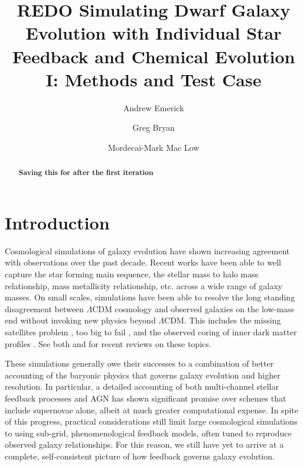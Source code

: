 \documentclass[twocolumn]{aastex61}
\begin{document}
\title{REDO Simulating Dwarf Galaxy Evolution with Individual Star Feedback and Chemical Evolution I: Methods and Test Case}
\author{Andrew Emerick}
\author{Greg Bryan}
\author{Mordecai-Mark Mac Low}


\begin{abstract}
\textbf{Saving this for after the first iteration}
\end{abstract}


\section{Introduction}

Cosmological simulations of galaxy evolution have shown increasing agreement with observations over the past decade. Recent works have been able to well capture the star forming main sequence, the stellar mass to halo mass relationship, mass metallicity relationship, etc. \citep[e.g.][]{EAGLE,Illustris1,Illustris2,FIRE,Dave2017} across a wide range of galaxy masses. On small scales, simulations have been able to resolve the long standing disagreement between $\Lambda$CDM cosmology and observed galaxies on the low-mass end without invoking new physics beyond $\Lambda$CDM. This includes the missing satellites problem \citep{Moore1999,Klypin1999}, too big to fail \citep{MBK2011,MBK2012,GK2014}, and the observed coring of inner dark matter profiles \citep[e.g.][]{Oh2011}. See both \cite{SomervilleDave2015} and \cite{NaabOstriker2016} for recent reviews on these topics. 

These simulations generally owe their successes to a combination of better accounting of the baryonic physics that governs galaxy evolution and higher resolution. In particular, a detailed accounting of both multi-channel stellar feedback processes and AGN has shown significant promise over schemes that include supernovae alone, albeit at much greater computational expense. In spite of this progress, practical considerations still limit large cosmological simulations to using sub-grid, phenomenological feedback models, often tuned to reproduce observed galaxy relationships. For this reason, we still have yet to arrive at a complete, self-consistent picture of how feedback governs galaxy evolution.
\end{document}
